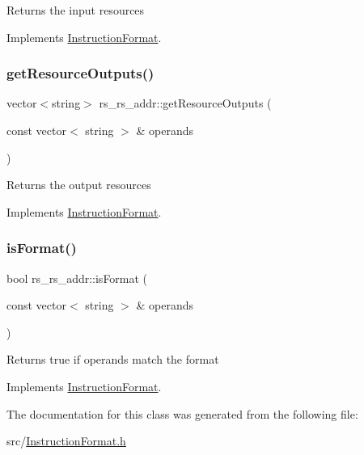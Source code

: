 Returns the input resources 

Implements \hyperlink{classInstructionFormat_a09775d3a3c22f40a0f44504664e586e4}{Instruction\+Format}.

\mbox{\label{classrs__rs__addr_a6918ea18f88f75f349bd59c397bb5ca1}} 
\subsubsection{\texorpdfstring{get\+Resource\+Outputs()}{getResourceOutputs()}}
{\footnotesize\ttfamily vector$<$string$>$ rs\+\_\+rs\+\_\+addr\+::get\+Resource\+Outputs (\begin{DoxyParamCaption}\item[{const vector$<$ string $>$ \&}]{operands }\end{DoxyParamCaption})\hspace{0.3cm}{\ttfamily [virtual]}}

Returns the output resources 

Implements \hyperlink{classInstructionFormat_a95cd28ffb1bde59b67f676880ab10536}{Instruction\+Format}.

\mbox{\label{classrs__rs__addr_a8e43a85fbdd3849d11088baa3db70185}} 
\subsubsection{\texorpdfstring{is\+Format()}{isFormat()}}
{\footnotesize\ttfamily bool rs\+\_\+rs\+\_\+addr\+::is\+Format (\begin{DoxyParamCaption}\item[{const vector$<$ string $>$ \&}]{operands }\end{DoxyParamCaption})\hspace{0.3cm}{\ttfamily [virtual]}}

Returns true if operands match the format 

Implements \hyperlink{classInstructionFormat_a9fdcf94dcd7d9a55ba86e7a63f04d1fe}{Instruction\+Format}.



The documentation for this class was generated from the following file\+:\begin{DoxyCompactItemize}
\item 
src/\hyperlink{InstructionFormat_8h}{Instruction\+Format.\+h}\end{DoxyCompactItemize}
